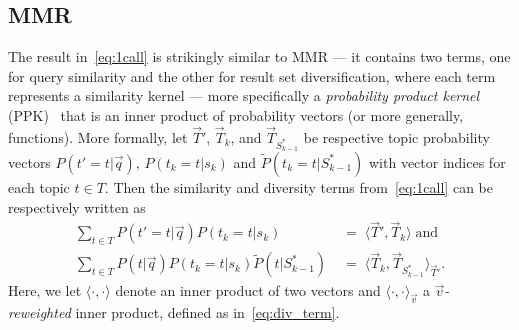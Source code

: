 
\subsection{MMR}

The result in~\eqref{eq:1call} is strikingly similar to MMR --- it
contains two terms, one for query similarity and the other for result
set diversification, where each term represents a similarity kernel
--- more specifically a \emph{probability product kernel}
(PPK)~\cite{prodprobkernel} that is an inner product of probability
vectors (or more generally, functions).  More formally, let
$\vec{T}'$, $\vec{T}_k$, and $\vec{T}_{S_{k-1}^*}$ be respective topic
probability vectors $P(t'=t|\vec{q})$, $P(t_k=t|s_k)$ and
$\tilde{P}(t_k=t | S_{k-1}^*)$ with vector indices for each topic $t
\in T$.  Then the similarity and diversity terms from~\eqref{eq:1call}
can be respectively written as
\begin{align}
\sum_{t \in T} P(t'=t|\vec{q}) P(t_k=t|s_{k}) & \; = \; \langle \vec{T}',\vec{T}_k \rangle \label{eq:sim_term} \; \mbox{and}\\
\sum_{t \in T} P(t|\vec{q}) P(t_k=t|s_k) \tilde{P}(t | S_{k-1}^*) & \; = \; \langle \vec{T}_k, \vec{T}_{S_{k-1}^*} \rangle_{\vec{T}'}. \label{eq:div_term}
\end{align}
Here, we let $\langle \cdot,\cdot \rangle$ denote an inner product of
two vectors and $\langle \cdot,\cdot \rangle_\vec{v}$ a
\emph{$\vec{v}$-reweighted} inner product, defined as
in~\eqref{eq:div_term}.

